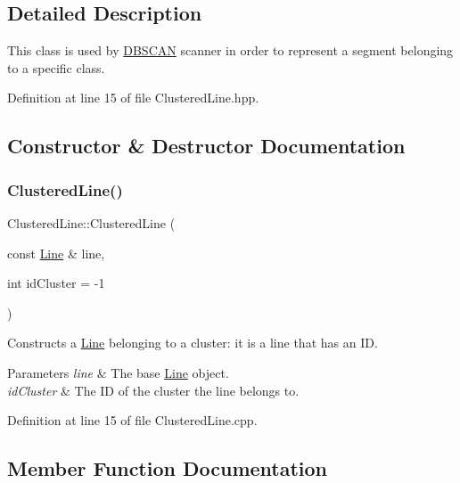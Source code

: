 \subsection{Detailed Description}
This class is used by \hyperlink{class_d_b_s_c_a_n}{D\+B\+S\+C\+AN} scanner in order to represent a segment belonging to a specific class. 

Definition at line 15 of file Clustered\+Line.\+hpp.



\subsection{Constructor \& Destructor Documentation}
\mbox{\label{classdefals_1_1_clustered_line_abf262f1f99c32a3c1ded4242fb4aebdb}} 
\subsubsection{\texorpdfstring{Clustered\+Line()}{ClusteredLine()}}
{\footnotesize\ttfamily Clustered\+Line\+::\+Clustered\+Line (\begin{DoxyParamCaption}\item[{const \hyperlink{classdefals_1_1_line}{Line} \&}]{line,  }\item[{int}]{id\+Cluster = {\ttfamily -\/1} }\end{DoxyParamCaption})}

Constructs a \hyperlink{classdefals_1_1_line}{Line} belonging to a cluster\+: it is a line that has an ID.


\begin{DoxyParams}{Parameters}
{\em line} & The base \hyperlink{classdefals_1_1_line}{Line} object. \\
\hline
{\em id\+Cluster} & The ID of the cluster the line belongs to. \\
\hline
\end{DoxyParams}


Definition at line 15 of file Clustered\+Line.\+cpp.



\subsection{Member Function Documentation}
\mbox{\label{classdefals_1_1_clustered_line_ade69f8e5a4c50da47d58fef43ca73f50}} 
